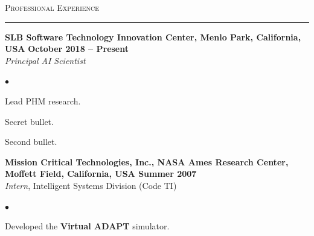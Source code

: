 \textsc{\Large{Professional Experience}}
\vspace{3pt}
\hrule

\begin{list}{}{\leftmargin=0in}

    \item \textbf{SLB Software Technology Innovation Center, Menlo Park, California, USA} \hfill \textbf{October 2018 -- Present}\\
          \textit{Principal AI Scientist}
          \vspace{10pt}
          \begin{list}{$\bullet$}{ \topsep -0.1in \itemsep -0.01in}
              \item Lead PHM research.
              \begin{internalblock}
              \item Secret bullet.
              \end{internalblock}
              \item Second bullet.
          \end{list}

    \item \textbf{Mission Critical Technologies, Inc., NASA Ames Research Center, Moffett Field, California, USA \hfill Summer 2007}\\
          \textit{Intern}, Intelligent Systems Division (Code TI)
          \vspace{10pt}
          \begin{list}{$\bullet$}{ \topsep -0.1in \itemsep -0.01in}
              \item Developed the \textbf{Virtual ADAPT} simulator.
          \end{list}

\end{list}
